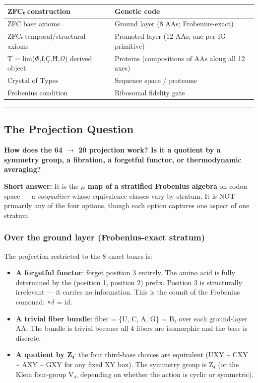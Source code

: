 \documentclass[12pt,a4paper]{article}
\begin{document}
\begin{table}[htbp]
\centering
\small
{}
\begin{tabularx}{\textwidth}{>{\centering\arraybackslash}X >{\centering\arraybackslash}X}
\toprule
\rowcolor{gray!25}\textbf{ZFCₜ construction} & \textbf{Genetic code} \\
\midrule
\rowcolors{1}{white}{gray!10}
ZFC base axioms & Ground layer (8 AAs; Frobenius-exact) \\
ZFCₜ temporal/structural axioms & Promoted layer (12 AAs; one per IG primitive) \\
T = lim($\Phi$,ƒ,Ç,Ħ,$\Omega$) derived object & Proteins (compositions of AAs along all 12 axes) \\
Crystal of Types & Sequence space / proteome \\
Frobenius condition & Ribosomal fidelity gate \\
\bottomrule
\end{tabularx}
\end{table}

\begin{center}
\rule{0.5\textwidth}{0.4pt}
\end{center}

\subsection{The Projection Question}

\textbf{How does the 64 $\rightarrow$ 20 projection work? Is it a quotient by a symmetry group,
a fibration, a forgetful functor, or thermodynamic averaging?}

\textbf{Short answer:} It is the \textbf{$\mu$ map of a stratified Frobenius algebra} on codon
space --- a \emph{coequalizer} whose equivalence classes vary by stratum. It is NOT primarily
any of the four options, though each option captures one aspect of one stratum.

\subsubsection{Over the ground layer (Frobenius-exact stratum)}

The projection restricted to the 8 exact boxes is:

\begin{itemize}
    \item \textbf{A forgetful functor}: forget position 3 entirely. The amino acid is fully
determined by the (position 1, position 2) prefix. Position 3 is structurally
irrelevant --- it carries no information. This is the counit of the Frobenius
comonad: \epsilon∘$\delta$ = id.
    \item \textbf{A trivial fiber bundle}: fiber = \{U, C, A, G\} = B₄ over each ground-layer AA.
The bundle is trivial because all 4 fibers are isomorphic and the base is discrete.
    \item \textbf{A quotient by Z₄}: the four third-base choices are equivalent
(UXY \textasciitilde{} CXY \textasciitilde{} AXY \textasciitilde{} GXY for any fixed XY box). The symmetry group is Z₄
(or the Klein four-group V₄, depending on whether the action is cyclic or symmetric).
\end{itemize}
\end{document}
